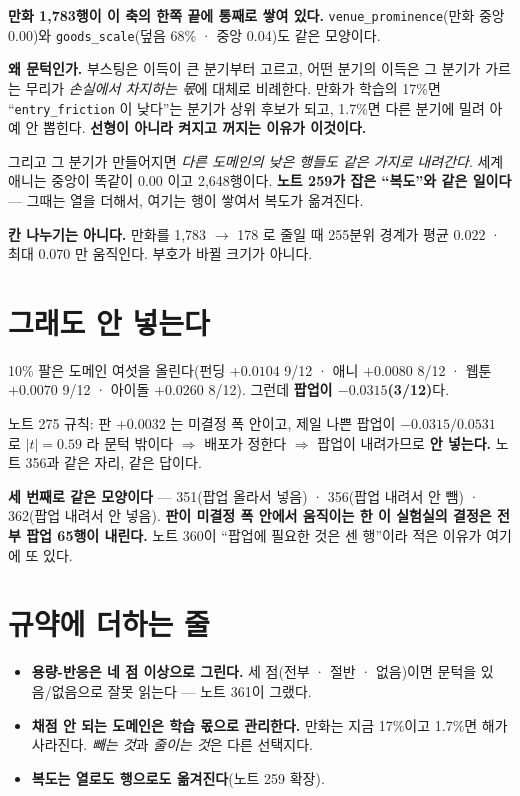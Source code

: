 \documentclass[11pt]{article}
\begin{document}
\textbf{만화 1,783행이 이 축의 한쪽 끝에 통째로 쌓여 있다.}
\texttt{venue\_prominence}(만화 중앙 0.00)와
\texttt{goods\_scale}(덮음 68\% · 중앙 0.04)도 같은 모양이다.

\textbf{왜 문턱인가.} 부스팅은 이득이 큰 분기부터 고르고, 어떤 분기의
이득은 그 분기가 가르는 무리가 \emph{손실에서 차지하는 몫}에 대체로
비례한다. 만화가 학습의 17\%면 ``\texttt{entry\_friction} 이 낮다''는
분기가 상위 후보가 되고, 1.7\%면 다른 분기에 밀려 아예 안 뽑힌다.
\textbf{선형이 아니라 켜지고 꺼지는 이유가 이것이다.}

그리고 그 분기가 만들어지면 \emph{다른 도메인의 낮은 행들도 같은 가지로
내려간다}. 세계애니는 중앙이 똑같이 0.00 이고 2,648행이다.
\textbf{노트 259가 잡은 ``복도''와 같은 일이다} --- 그때는 열을 더해서,
여기는 행이 쌓여서 복도가 옮겨진다.

\textbf{칸 나누기는 아니다.} 만화를 1,783 $\to$ 178 로 줄일 때 255분위
경계가 평균 $0.022$ · 최대 $0.070$ 만 움직인다. 부호가 바뀔 크기가 아니다.

\section{그래도 안 넣는다}

10\% 팔은 도메인 여섯을 올린다(펀딩 $+0.0104$ 9/12 · 애니 $+0.0080$ 8/12 ·
웹툰 $+0.0070$ 9/12 · 아이돌 $+0.0260$ 8/12). 그런데 \textbf{팝업이
$-0.0315$(3/12)}다.

노트 275 규칙: 판 $+0.0032$ 는 미결정 폭 안이고, 제일 나쁜 팝업이
$-0.0315/0.0531$ 로 $|t| = 0.59$ 라 문턱 밖이다 $\Rightarrow$ 배포가
정한다 $\Rightarrow$ 팝업이 내려가므로 \textbf{안 넣는다.} 노트 356과
같은 자리, 같은 답이다.

\textbf{세 번째로 같은 모양이다} --- 351(팝업 올라서 넣음) · 356(팝업
내려서 안 뺌) · 362(팝업 내려서 안 넣음). \textbf{판이 미결정 폭 안에서
움직이는 한 이 실험실의 결정은 전부 팝업 65행이 내린다.} 노트 360이
``팝업에 필요한 것은 센 행''이라 적은 이유가 여기에 또 있다.

\section{규약에 더하는 줄}

\begin{itemize}
\item \textbf{용량-반응은 네 점 이상으로 그린다.} 세 점(전부 · 절반 ·
없음)이면 문턱을 있음/없음으로 잘못 읽는다 --- 노트 361이 그랬다.
\item \textbf{채점 안 되는 도메인은 학습 몫으로 관리한다.} 만화는 지금
17\%이고 1.7\%면 해가 사라진다. \emph{빼는 것}과 \emph{줄이는 것}은 다른
선택지다.
\item \textbf{복도는 열로도 행으로도 옮겨진다}(노트 259 확장).
\end{itemize}
\end{document}
